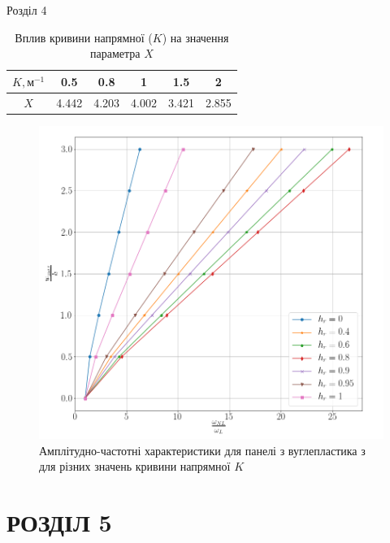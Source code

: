 \documentclass[8pt]{beamer}
\numberwithin{figure}{section}
\numberwithin{equation}{section}
\numberwithin{table}{section}
\begin{document}
\begin{frame}{Розділ 4}
\begin{table}[h!]
\caption{Вплив кривини напрямної ($K$) на значення параметра $X$}
\centering
 \begin{tabular}{| c | c | c | c | c | c |} 
 \hline
 $K, м^{-1}$ & 0.5 & 0.8 & 1 & 1.5 & 2 \\ 
  \hline
 $X$ & 4.442 & 4.203 & 4.002 & 3.421 & 2.855 \\
   \hline
\end{tabular}
\end{table}

\begin{figure}
	\includegraphics[scale=0.2]{pic/AFR_curvature2.png}
		\caption{Амплітудно-частотні характеристики для панелі з вуглепластика з для різних значень кривини напрямної $K$}
		\label{fig:AFR_layers}
\end{figure}

\end{frame}

\section{РОЗДІЛ 5}
\end{document}
